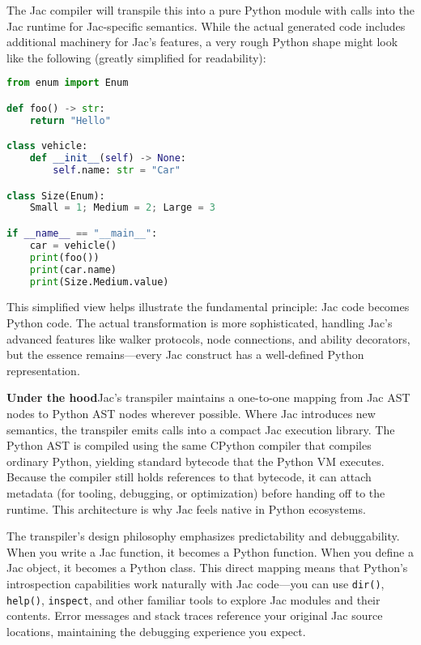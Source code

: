 The Jac compiler will transpile this into a pure Python module with calls into the Jac runtime for Jac-specific semantics. While the actual generated code includes additional machinery for Jac's features, a very rough Python shape might look like the following (greatly simplified for readability):

\begin{lstlisting}[language=Python]
from enum import Enum

def foo() -> str:
    return "Hello"

class vehicle:
    def __init__(self) -> None:
        self.name: str = "Car"

class Size(Enum):
    Small = 1; Medium = 2; Large = 3

if __name__ == "__main__":
    car = vehicle()
    print(foo())
    print(car.name)
    print(Size.Medium.value)
\end{lstlisting}

This simplified view helps illustrate the fundamental principle: Jac code becomes Python code. The actual transformation is more sophisticated, handling Jac's advanced features like walker protocols, node connections, and ability decorators, but the essence remains—every Jac construct has a well-defined Python representation.

\begin{nerd}
\textbf{Under the hood}\quad Jac's transpiler maintains a one-to-one mapping from Jac AST nodes to Python AST nodes wherever possible. Where Jac introduces new semantics, the transpiler emits calls into a compact Jac execution library. The Python AST is compiled using the same CPython compiler that compiles ordinary Python, yielding standard bytecode that the Python VM executes. Because the compiler still holds references to that bytecode, it can attach metadata (for tooling, debugging, or optimization) before handing off to the runtime. This architecture is why Jac feels native in Python ecosystems.
\end{nerd}

The transpiler's design philosophy emphasizes predictability and debuggability. When you write a Jac function, it becomes a Python function. When you define a Jac object, it becomes a Python class. This direct mapping means that Python's introspection capabilities work naturally with Jac code—you can use \texttt{dir()}, \texttt{help()}, \texttt{inspect}, and other familiar tools to explore Jac modules and their contents. Error messages and stack traces reference your original Jac source locations, maintaining the debugging experience you expect.

